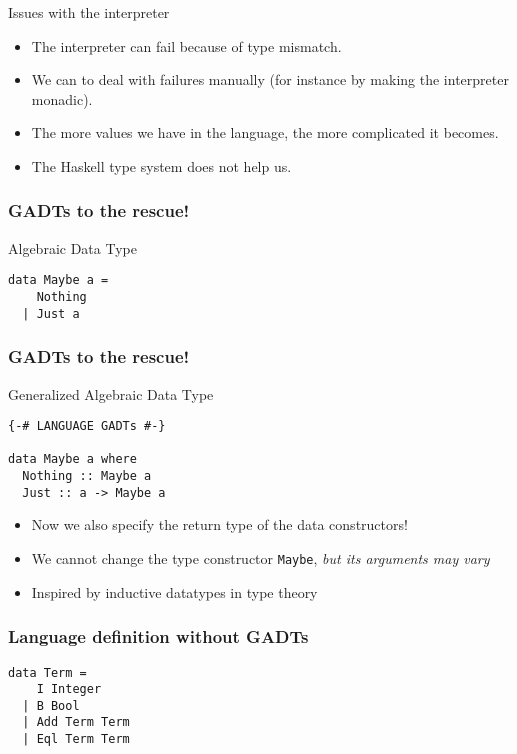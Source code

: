 \documentclass[pdftex,aspectratio=169]{beamer}
\begin{document}
\begin{frame}{Issues with the interpreter}
  \begin{itemize}[<+->]
\item The interpreter can fail because of type mismatch.
\item We can to deal with failures manually (for instance by making
  the interpreter monadic).
\item The more values we have in the language, the more complicated it becomes.
\item The Haskell type system does not help us.
\end{itemize}
\end{frame}

\begin{frame}[fragile]
  \frametitle{GADTs to the rescue!}

  \begin{block}{Algebraic Data Type}
    \begin{lstlisting}
data Maybe a =
    Nothing
  | Just a
\end{lstlisting}

  \end{block}
\end{frame}

\begin{frame}[fragile]
  \frametitle{GADTs to the rescue!}

  \begin{block}{Generalized Algebraic Data Type}
    \begin{lstlisting}
{-# LANGUAGE GADTs #-}

data Maybe a where
  Nothing :: Maybe a
  Just :: a -> Maybe a
\end{lstlisting}

  \end{block}\pause
  \begin{itemize}
  \item Now we also specify the return type of the data constructors!
  \item We cannot change the type constructor \lstinline{Maybe}, \emph{but
    its arguments may vary}
  \item Inspired by inductive datatypes in type theory
  \end{itemize}
\end{frame}

\begin{frame}[fragile]
  \frametitle{Language definition without GADTs}
  \begin{block}{}
    \begin{lstlisting}
data Term =
    I Integer
  | B Bool
  | Add Term Term
  | Eql Term Term      
    \end{lstlisting}
  \end{block}
\end{frame}
\end{document}
